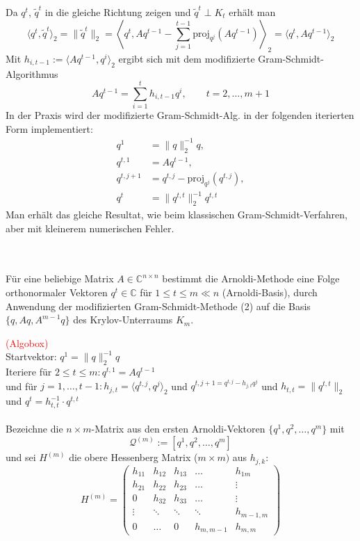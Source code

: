 Da $q^t$, $\tilde{q}^t$ in die gleiche Richtung zeigen und $\tilde{q}^t\perp K_t$ erhält man 
\[\langle q^t, \tilde{q}^t\rangle_2 = \|\tilde{q}^t\|_2 = 
\left\langle q^t,Aq^{t-1} - \sum_{j=1}^{t-1} \text{proj}_{q^j}(Aq^{t-1})\right\rangle_2 = \langle q^t, Aq^{t-1}\rangle_2\]
Mit $h_{i,t-1} := \langle Aq^{t-1},q^i \rangle_2$ ergibt sich mit dem modifizierte Gram-Schmidt-Algorithmus
\[Aq^{t-1}=\sum_{i=1}^{t} h_{i,t-1 }q^i, \qquad t=2,\dotsc,m+1\]
In der Praxis wird der modifizierte Gram-Schmidt-Alg. in der folgenden iterierten Form implementiert:
\begin{align*}
    q^1 &= \|q\|_2^{-1}q, \\
    q^{t,1}&=Aq^{t-1}, \\
    q^{t,j+1}&=q^{t,j}-\text{proj}_{q^j}(q^{t,j}), \tag{2}\\
    q^t&=\|q^{t,t}\|_2^{-1}q^{t,t}
\end{align*}
Man erhält das gleiche Resultat, wie beim klassischen Gram-Schmidt-Verfahren, aber mit kleinerem numerischen Fehler. \\ \\
\begin{defbox} \ \\
    Für eine beliebige Matrix $A\in\mathbb{C}^{n\times n}$ bestimmt die Arnoldi-Methode eine Folge orthonormaler 
    Vektoren $q^t\in\mathbb{C}$ für $1\leq t \leq m \ll n$ (Arnoldi-Basis), durch Anwendung der modifizierten 
    Gram-Schmidt-Methode (2) auf die Basis $\{q,Aq,A^{m-1}q\}$ des Krylov-Unterraums $K_m$.
\end{defbox}
\textcolor{red}{(Algobox)} \\
Startvektor: $q^1=\|q\|^{-1}_2 q$ \\
Iteriere für $2\leq t\leq m: q^{t,1}=Aq^{t-1}$ \\
und für $j=1,\dotsc,t-1: h_{j,t} = \langle q^{t,j},q^j\rangle_2$ und $q^{t,j+1=q^{t,j}-h_{j,t}q^j}$ und $h_{t,t}=\|q^{t,t}\|_2$ 
und $q^t = h_{t,t}^{-1}\cdot q^{t,t}$ \\ \\
Bezeichne die $n\times m$-Matrix aus den ersten Arnoldi-Vektoren $\{q^1,q^2,\dotsc,q^m\}$ mit 
\[\mathcal{Q}^{(m)}:=[q^1,q^2,\dotsc,q^m]\] und sei $H^{(m)}$ die obere Hessenberg Matrix ($m\times m)$ aus $h_{j,k}$:
\[H^{(m)} = \begin{pmatrix}
    h_{11} & h_{12} & h_{13} & \dotsc & h_{1m} \\
    h_{21} & h_{22} & h_{23} & \dotsc & \vdots \\
    0 & h_{32} & h_{33} & \dotsc & \vdots \\
    \vdots & \ddots &  \ddots &   \ddots &  h_{m-1,m} \\
    0 &\dotsc & 0 & h_{m,m-1} & h_{m,m}
\end{pmatrix}\]
